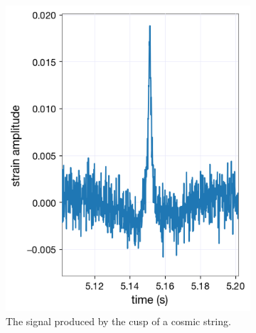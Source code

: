 \documentclass{article}
\begin{document}
\begin{multicols}{2}
\begin{figure}[H]
\begin{subfigure}[b]{0.49\columnwidth}
        \includegraphics[width=\linewidth]{../Dataplots/injection3.png}
        \caption{The signal produced by the cusp of a cosmic string.}
    \end{subfigure}
    \hfill
    \begin{subfigure}[b]{0.49\columnwidth}

\end{subfigure}
\end{figure}
\end{multicols}
\end{document}
